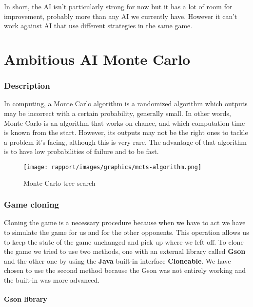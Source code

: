         In short, the AI isn't particularly strong for now but it has a lot of room for improvement, probably more than any AI we currently have. However it can't work against AI that use different strategies in the same game.

\newpage
\part{Ambitious AI Monte Carlo}
        \section{Description}
        In computing, a Monte Carlo algorithm is a randomized algorithm which outputs may be incorrect with a certain probability, generally small. In other words, Monte-Carlo is an algorithm that works on chance, and which computation time is known from the start. However, its outputs may not be the right ones to tackle a problem it's facing, although this is very rare. The advantage of that algorithm is to have low probabilities of failure and to be fast.
        
        \begin{figure}[H]
            \centering
            \texttt{[image: rapport/images/graphics/mcts-algorithm.png]}
            \caption{Monte Carlo tree search}
            \label{Monte_carlo_tree_search}
        \end{figure}
        
        
        
        \section{Game cloning}
        Cloning the game is a necessary procedure because when we have to act we have to simulate the game for us and for the other opponents. This operation allows us to keep the state of the game unchanged and pick up where we left off.
        To clone the game we tried to use two methods, one with an external library called \textbf{Gson} and the other one by using the \textbf{Java} built-in interface \textbf{Cloneable}. 
        We have chosen to use the second method because the Gson was not entirely working and the built-in was more advanced.
        
        \subsection{Gson library}
        
